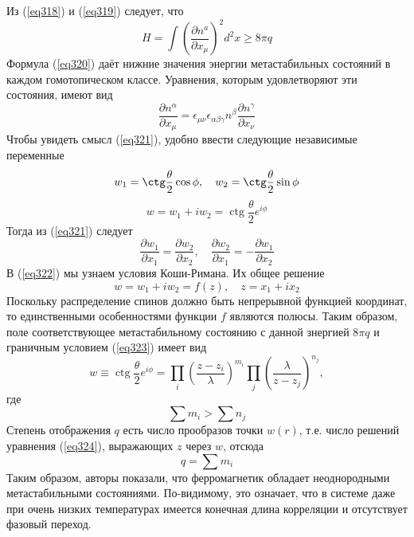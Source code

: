\documentclass[12pt]{article}
\theoremstyle{definition}
\begin{document}
Из (\ref{eq318}) и (\ref{eq319}) следует, что
\begin{equation}\label{eq320}
    H=\int\left(\frac{\partial n^a}{\partial x_\mu}\right)^2d^2x \geq 8\pi q
\end{equation}
Формула (\ref{eq320}) даёт нижние значения энергии метастабильных состояний в каждом гомотопическом классе. Уравнения, которым удовлетворяют эти состояния, имеют вид
\begin{equation}\label{eq321}
    \frac{\partial n^\alpha}{\partial x_\mu}=\epsilon_{\mu\nu}\epsilon_{\alpha\beta\gamma}n^\beta\frac{\partial n^\gamma}{\partial x_\nu}
\end{equation}
Чтобы увидеть смысл (\ref{eq321}), удобно ввести следующие независимые переменные
\begin{equation}
    w_1=\ctg\frac{\theta}{2} \cos \phi,\quad w_2=\ctg\frac{\theta}{2}\sin\phi
\end{equation}
\begin{equation}
    w=w_1+i w_2=\operatorname{ctg} \frac{\theta}{2} e^{i \phi}
\end{equation}
Тогда из (\ref{eq321}) следует
\begin{equation}\label{eq322}
    \frac{\partial w_1}{\partial x_1}=\frac{\partial w_2}{\partial x_2},\quad \frac{\partial w_2}{\partial x_1}=-\frac{\partial w_1}{\partial x_2}
\end{equation}
В (\ref{eq322}) мы узнаем условия Коши-Римана. Их общее решение
\begin{equation}
    w=w_1+iw_2=f(z),\quad z=x_1+ix_2
\end{equation}
Поскольку распределение спинов должно быть непрерывной функцией координат, то единственными особенностями функции $f$ являются полюсы. Таким образом, поле соответствующее метастабильному состоянию с данной знергией $8 \pi q$ и граничным условием (\ref{eq323}) имеет вид
\begin{equation}\label{eq324}
    w \equiv \operatorname{ctg} \frac{\theta}{2} e^{i \phi}=\prod\limits_i\left(\frac{z-z_i}{\lambda}\right)^{m_i} \prod\limits_j\left(\frac{\lambda}{z-z_j}\right)^{n_j},
\end{equation}
где
\begin{equation}
    \sum m_i>\sum n_j
\end{equation}
Степень отображения $q$ есть число прообразов точки $w(r)$, т.е. число решений уравнения (\ref{eq324}), выражающих $z$ через $w$, отсюда
\begin{equation}
    q=\sum m_i
\end{equation}
Таким образом, авторы показали, что ферромагнетик обладает неоднородными метастабильными состояниями. По-видимому, это означает, что в системе даже при очень низких температурах имеется конечная длина корреляции и отсутствует фазовый переход.
\end{document}
